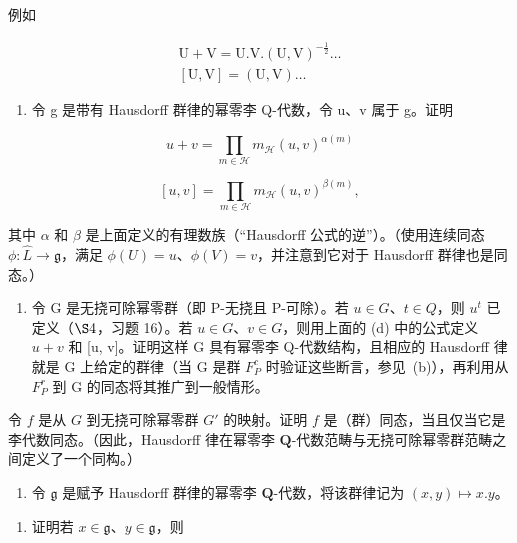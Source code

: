 例如

\[
\begin{array}{c} \mathrm{U} + \mathrm{V} = \mathrm{U}. \mathrm{V}. (\mathrm{U}, \mathrm{V}) ^ {- \frac {1}{2}} \dots \\ {} [ \mathrm{U}, \mathrm{V} ] = (\mathrm{U}, \mathrm{V}) \dots \end{array}
\]

\begin{enumerate}
\def\labelenumi{(\alph{enumi})}
\setcounter{enumi}{3}
\tightlist
\item
  令 g 是带有 Hausdorff 群律的幂零李 Q-代数，令 u、v 属于 g。证明
\end{enumerate}

\[
u + v = \prod_ {m \in \mathcal {H}} m _ {\mathcal {H}} (u, v) ^ {\alpha (m)}
\]

\[
[ u, v ] = \prod_ {m \in \mathcal {H}} m _ {\mathcal {H}} (u, v) ^ {\beta (m)},
\]

其中 \(\alpha\) 和 \(\beta\) 是上面定义的有理数族（“Hausdorff 公式的逆”）。（使用连续同态 \(\phi\colon\hat{L}\to\mathfrak{g}\)，满足 \(\phi(U)=u\)、\(\phi(V)=v\)，并注意到它对于 Hausdorff 群律也是同态。）

\begin{enumerate}
\def\labelenumi{(\alph{enumi})}
\setcounter{enumi}{4}
\tightlist
\item
  令 G 是无挠可除幂零群（即 P-无挠且 P-可除）。若 \(u \in G\)、\(t \in Q\)，则 \(u^{t}\) 已定义（\(\S 4\)，习题 16）。若 \(u \in G\)、\(v \in G\)，则用上面的 (d) 中的公式定义 \(u + v\) 和 {[}u, v{]}。证明这样 G 具有幂零李 Q-代数结构，且相应的 Hausdorff 律就是 G 上给定的群律（当 G 是群 \(F_{P}^{c}\) 时验证这些断言，参见~(b)），再利用从 \(F_{P}^{r}\) 到 G 的同态将其推广到一般情形。
\end{enumerate}

令 \(f\) 是从 \(G\) 到无挠可除幂零群 \(G'\) 的映射。证明 \(f\) 是（群）同态，当且仅当它是李代数同态。（因此，Hausdorff 律在幂零李 \(\mathbf{Q}\)-代数范畴与无挠可除幂零群范畴之间定义了一个同构。）

\begin{enumerate}
\def\labelenumi{\arabic{enumi}.}
\setcounter{enumi}{4}
\tightlist
\item
  令 \(\mathfrak{g}\) 是赋予 Hausdorff 群律的幂零李 \(\mathbf{Q}\)-代数，将该群律记为 \((x,y)\mapsto x.y\)。
\end{enumerate}

\begin{enumerate}
\def\labelenumi{(\alph{enumi})}
\tightlist
\item
  证明若 \(x \in \mathfrak{g}\)、\(y \in \mathfrak{g}\)，则
\end{enumerate}


